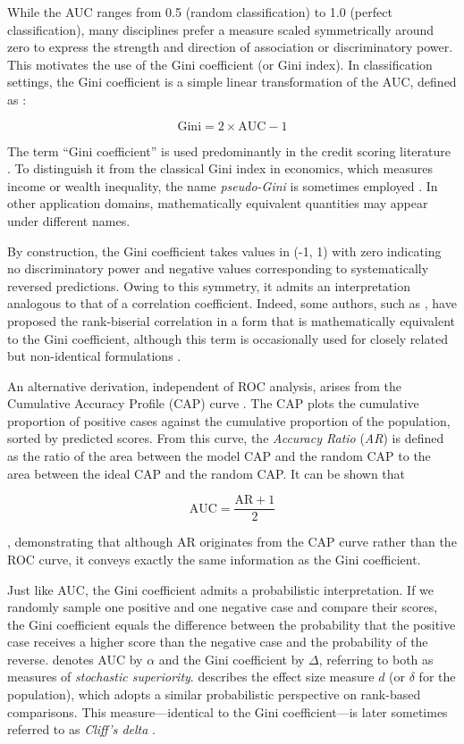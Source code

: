 While the AUC ranges from 0.5 (random classification) to 1.0 (perfect
classification), many disciplines prefer a measure scaled symmetrically
around zero to express the strength and direction of association or
discriminatory power. This motivates the use of the Gini coefficient (or
Gini index). In classification settings, the Gini coefficient is a
simple linear transformation of the AUC, defined as \citep{Hand_Till_2001}:

\[\text{Gini} = 2 \times \text{AUC} - 1\]

The term ``Gini coefficient'' is used predominantly in the credit scoring
literature \citep{Anderson_2007, Rezac_Rezac_2011}. To distinguish it from
the classical Gini index in economics, which measures income or wealth
inequality, the name \emph{pseudo-Gini} is sometimes employed \citep{Idczak_2019}.
In other application domains, mathematically equivalent quantities may
appear under different names.

By construction, the Gini coefficient takes values in (-1, 1) with zero
indicating no discriminatory power and negative values corresponding to
systematically reversed predictions. Owing to this symmetry, it admits
an interpretation analogous to that of a correlation coefficient.
Indeed, some authors, such as \citet{Wendt_1972}, have proposed the
rank-biserial correlation in a form that is mathematically equivalent to
the Gini coefficient, although this term is occasionally used for
closely related but non-identical formulations \citep{Rubia_2022}.

An alternative derivation, independent of ROC analysis, arises from the
Cumulative Accuracy Profile (CAP) curve \citep{Sobehart_Keenan_Stein_2000}.
The CAP plots the cumulative proportion of positive cases against the
cumulative proportion of the population, sorted by predicted scores.
From this curve, the \emph{Accuracy Ratio} (\emph{AR}) is defined as the ratio of
the area between the model CAP and the random CAP to the area between
the ideal CAP and the random CAP. It can be shown that

\[\text{AUC} = \frac{\text{AR} + 1}{2}\]

\citep{Engelmann_Hayden_Tasche_2003}, demonstrating that although AR
originates from the CAP curve rather than the ROC curve, it conveys
exactly the same information as the Gini coefficient.

Just like AUC, the Gini coefficient admits a probabilistic
interpretation. If we randomly sample one positive and one negative case
and compare their scores, the Gini coefficient equals the difference
between the probability that the positive case receives a higher score
than the negative case and the probability of the reverse. \citet{Agresti_2010}
denotes AUC by \(\alpha\) and the Gini coefficient by \(\Delta\), referring
to both as measures of \emph{stochastic superiority}. \citet{Cliff_1993} describes
the effect size measure \(d\) (or \(\delta\) for the population), which
adopts a similar probabilistic perspective on rank-based comparisons.
This measure---identical to the Gini coefficient---is later sometimes
referred to as \emph{Cliff's delta} \citep{Bais_Van_Der_Neut_2022}.

